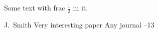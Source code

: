 \documentclass{article}
\begin{document}

\author{Author's Name}

Some text with frac $\frac{1}{2}$ in it.

\begin{thebibliography}{99}


\by J.~Smith
\paper Very interesting paper
\jour Any journal
--13


\end{thebibliography}
\end{document}
